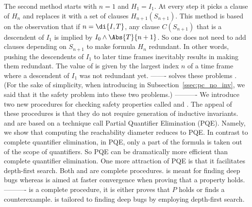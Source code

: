The second method starts with $n=1$ and $H_1 = I_1$.  At every step it
picks a clause of $H_n$ and replaces it with a set of clauses
$H_{n+1}(S_{n+1})$. This method is based on the observation that if $n
= \di{I,T}$, any clause $C(S_{n+1})$ that is a descendent of $I_1$ is
implied by $I_0 \wedge \Abs{T}{n+1}$. So one does not need to add
clauses depending on $S_{n+1}$ to make formula $H_n$ redundant. In
other words, pushing the descendents of $I_1$ to later time frames
inevitably results in making them redundant. The value of  is
given by the largest index $n$ of a time frame where a descendent of
$I_1$ was not redundant yet.
-------
\FB solves these problems . (For the sake of simplicity,
when introducing \FB in Subsection~\ref{ssec:pc_no_inv}, we said that
it  the safety problem into these two problems.)
----------
We introduce two new procedures for checking safety properties called
\FB and \pp. The appeal of these procedures is that they do not
require generation of inductive invariants. \FB and \PP are based on a
technique call Partial Quantifier Elimination (PQE). Namely, we show
that computing the reachability diameter reduces to PQE. In contrast
to complete quantifier elimination, in PQE, only a part of the formula
is taken out of the scope of quantifiers. So PQE can be dramatically
more efficient than complete quantifier elimination. One more
attraction of PQE is that it facilitates depth-first search.  Both \FB
and \PP are complete procedures. \FB is meant for finding deep bugs
whereas \PP is aimed at faster convergence when proving that a
property holds.
----------
\FB is a complete procedure, it is either proves that $P$
holds or finds a counterexample. \FB is tailored to finding deep bugs
by employing depth-first search.

